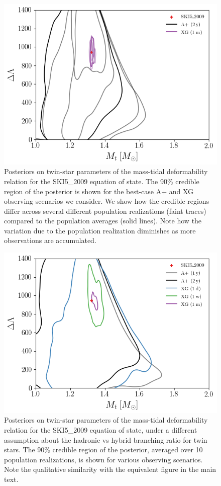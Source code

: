 \documentclass[aps,prl,twocolumn,superscriptaddress,footinbib]{revtex4-1}
\begin{document}
\begin{figure}[t]
      \includegraphics[width=0.9\columnwidth]{SKI52009_pops.png}
    \caption{Posteriors on twin-star parameters of the mass-tidal deformability relation for the SKI5\_2009 equation of state. The 90\% credible region of the posterior is shown for the best-case A+ and XG observing scenarios we consider. We show how the credible regions differ across several different population realizations (faint traces) compared to the population averages (solid lines). Note how the variation due to the population realization diminishes as more observations are accumulated.}
    \label{fig:results_indiv}
\end{figure}

\begin{figure}[t]
    \includegraphics[width=0.9\columnwidth]{SKI52009_br.png}
    \caption{Posteriors on twin-star parameters of the mass-tidal deformability relation for the SKI5\_2009 equation of state, under a different assumption about the hadronic vs hybrid branching ratio for twin stars. The 90\% credible region of the posterior, averaged over 10 population realizations, is shown for various observing scenarios. Note the qualitative similarity with the equivalent figure in the main text.}
    \label{fig:branch_results}
\end{figure}
\end{document}
